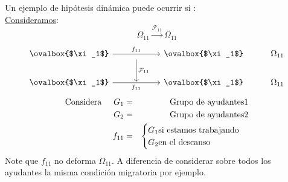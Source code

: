 \documentclass[]{article}
\begin{document}
Un ejemplo de hip\'otesis din\'amica puede ocurrir si :\\
\underline{Consideramos}:
\begin{equation}
\Omega_{11}\xrightarrow{\mathcal{F}_{11}} \Omega_{11}
\end{equation}
\begin{equation*}
\begin{tikzcd}
\ovalbox{$\xi_1$}\arrow{rr}{f_{11}}&\arrow{d}{\mathcal{F}_{11}}&\ovalbox{$\xi_1$}&\Omega_{11}\\
\ovalbox{$\xi_1$}\arrow{rr}[swap]{f_{11}}&{}&\ovalbox{$\xi_1$}&\Omega_{11}
\end{tikzcd}
\end{equation*}
\begin{eqnarray*}
\text{Considera}\hspace{0.5cm}  G_{1}&=&\text{Grupo de ayudantes} 1\\
 								  G_{2}&=&\text{Grupo de ayudantes} 2\\
 								  f_{11}&=&\begin{cases}
 								  	G_1\text{si estamos trabajando}\\
 								  	G_2\text{en el descanso}
 								  \end{cases}
\end{eqnarray*}
Note que $f_{11}$ no deforma $\Omega_{11}$. A diferencia de considerar sobre todos los ayudantes la misma condici\'on migratoria por ejemplo. 
\end{document}
